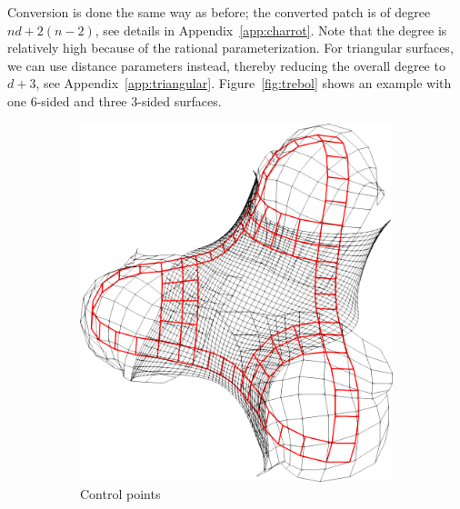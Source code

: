 \documentclass[9pt,academicons]{article}
\begin{document}
Conversion is done the same way as before; the converted patch is of degree $nd+2(n-2)$,
see details in Appendix~\ref{app:charrot}.
Note that the degree is relatively high because of the rational parameterization.
For triangular surfaces, we can use distance parameters instead,
thereby reducing the overall degree to $d+3$, see Appendix~\ref{app:triangular}.
Figure~\ref{fig:trebol} shows an example with one 6-sided and three 3-sided surfaces.
\begin{figure}
  \begin{subfigure}{.24\textwidth}
    \centering
    \includegraphics[height=.2\textheight]{images/trebol3-cnet.png}
    \caption{Control points}
    \label{fig:trebol-cnet}
  \end{subfigure}
  \hfill
  \begin{subfigure}{.24\textwidth}
    \centering

\end{subfigure}
\end{figure}
\end{document}
